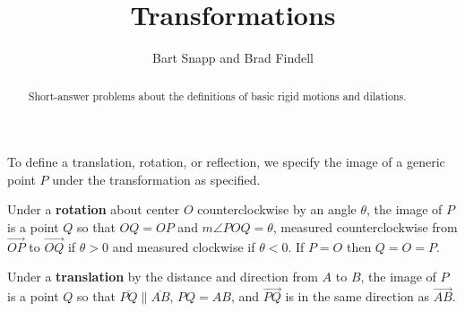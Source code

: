 \documentclass[nooutcomes]{ximera}
\title{Transformations}
\author{Bart Snapp and Brad Findell}
\begin{document}
\begin{abstract}
Short-answer problems about the definitions of basic rigid motions and dilations.
\end{abstract}
\maketitle




To define a translation, rotation, or reflection, we specify the image of a generic point $P$ under the transformation as specified.  

\begin{question}
Under a \textbf{rotation} about center $O$ counterclockwise by an angle $\theta$, the image of $P$ is 
a point $Q$ so that $OQ = OP$ and $m\angle POQ = \theta$, measured counterclockwise 
from $\overrightarrow{OP}$ to $\overrightarrow{OQ}$ if $\theta>0$ and measured clockwise if $\theta<0$.  If $P = O$ then $Q=O=P$.  
\end{question}

\begin{question}
Under a \textbf{translation} by the distance and direction from $A$ to $B$, the image of $P$ is a point $Q$ so that $\overline{PQ} \parallel \overline{AB}$, $PQ=AB$, and $\overrightarrow{PQ}$ is in the same direction as $\overrightarrow{AB}$.  
\end{question}
\end{document}
